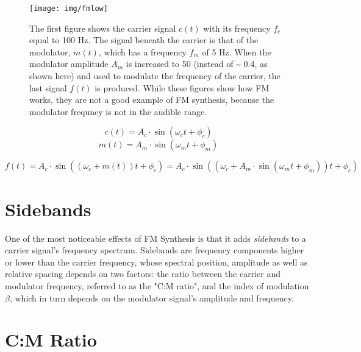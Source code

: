 \pagebreak

\begin{figure}[]
  \texttt{[image: img/fmlow]}
  \caption{The first figure shows the carrier signal $c(t)$ with its frequency $f_{c}$ equal to 100 Hz. The signal beneath the carrier is that of the modulator, $m(t)$, which has a frequency $f_{m}$ of 5 Hz. When the modulator amplitude $A_{m}$ is increased to 50 (instead of \textasciitilde{} 0.4, as shown here) and used to modulate the frequency of the carrier, the last signal $f(t)$ is produced. While these figures show how FM works, they are not a good example of FM synthesis, because the modulator frequncy is not in the audible range.}
  \label{fig:fmlow}
\end{figure}

\begin{multicols}{2}
  \begin{equation}
    c(t) = A_{c} \cdot \sin(\omega_{c}t + \phi_{c})
    \end{equation}\break
    \begin{equation}
      m(t) = A_{m} \cdot \sin(\omega_{m}t + \phi_{m})
    \end{equation}
  \end{multicols}

  \begin{equation}
    f(t) = A_{c} \cdot \sin((\omega_{c} + m(t))t + \phi_{c}) = A_{c} \cdot \sin((\omega_{c} + A_{m} \cdot \sin(\omega_{m}t + \phi_{m}))t + \phi_{c})
    \label{eq:fm}
  \end{equation}

  \section{Sidebands}

  One of the most noticeable effects of FM Synthesis is that it adds \emph{sidebands} to a carrier signal's frequency spectrum. Sidebands are frequency components higher or lower than the carrier frequency, whose spectral position, amplitude as well as relative spacing depends on two factors: the ratio between the carrier and modulator frequency, referred to as the "C:M ratio", and the index of modulation $\beta$, which in turn depends on the modulator signal's amplitude and frequency.

  \section{C:M Ratio}

